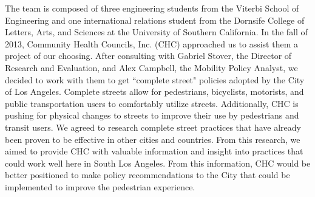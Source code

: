 The team is composed of three engineering students from the Viterbi School of Engineering and one international relations student from the Dornsife College of Letters, Arts, and Sciences at the University of Southern California.  In the fall of 2013, Community Health Councils, Inc. (CHC) approached us to assist them a project of our choosing.  After consulting with Gabriel Stover, the Director of Research and Evaluation, and Alex Campbell, the Mobility Policy Analyst, we decided to work with them to get ``complete street" policies adopted by the City of Los Angeles.  Complete streets allow for pedestrians, bicyclists, motorists, and public transportation users to comfortably utilize streets.  Additionally, CHC is pushing for physical changes to streets to improve their use by pedestrians and transit users.  We agreed to research complete street practices that have already been proven to be effective in other cities and countries.  From this research, we aimed to provide CHC with valuable information and insight into practices that could work well here in South Los Angeles.  From this information, CHC would be better positioned to make policy recommendations to the City that could be implemented to improve the pedestrian experience.